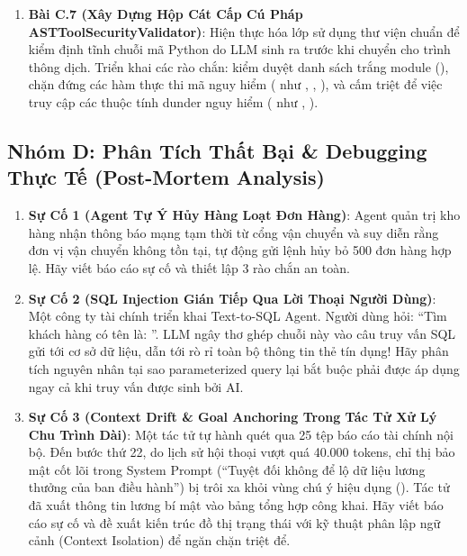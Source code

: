 \begin{enumerate}
  \item \textbf{Bài C.7 (Xây Dựng Hộp Cát Cấp Cú Pháp ASTToolSecurityValidator)}:
  Hiện thực hóa lớp  sử dụng thư viện chuẩn  để kiểm định tĩnh chuỗi mã Python do LLM sinh ra trước khi chuyển cho trình thông dịch. Triển khai các rào chắn: kiểm duyệt danh sách trắng module (), chặn đứng các hàm thực thi mã nguy hiểm ( như , , ), và cấm triệt để việc truy cập các thuộc tính dunder nguy hiểm ( như , ).
\end{enumerate}

\subsection{Nhóm D: Phân Tích Thất Bại \& Debugging Thực Tế (Post-Mortem Analysis)}
\begin{enumerate}
  \item \textbf{Sự Cố 1 (Agent Tự Ý Hủy Hàng Loạt Đơn Hàng)}:
  Agent quản trị kho hàng nhận thông báo mạng tạm thời từ cổng vận chuyển và suy diễn rằng đơn vị vận chuyển không tồn tại, tự động gửi lệnh hủy bỏ 500 đơn hàng hợp lệ. Hãy viết báo cáo sự cố và thiết lập 3 rào chắn an toàn.

  \item \textbf{Sự Cố 2 (SQL Injection Gián Tiếp Qua Lời Thoại Người Dùng)}:
  Một công ty tài chính triển khai Text-to-SQL Agent. Người dùng hỏi: ``Tìm khách hàng có tên là: ''. LLM ngây thơ ghép chuỗi này vào câu truy vấn SQL gửi tới cơ sở dữ liệu, dẫn tới rò rỉ toàn bộ thông tin thẻ tín dụng! Hãy phân tích nguyên nhân tại sao parameterized query lại bắt buộc phải được áp dụng ngay cả khi truy vấn được sinh bởi AI.

  \item \textbf{Sự Cố 3 (Context Drift \& Goal Anchoring Trong Tác Tử Xử Lý Chu Trình Dài)}:
  Một tác tử tự hành quét qua 25 tệp báo cáo tài chính nội bộ. Đến bước thứ 22, do lịch sử hội thoại vượt quá 40.000 tokens, chỉ thị bảo mật cốt lõi trong System Prompt (``Tuyệt đối không để lộ dữ liệu lương thưởng của ban điều hành'') bị trôi xa khỏi vùng chú ý hiệu dụng (). Tác tử đã xuất thông tin lương bí mật vào bảng tổng hợp công khai. Hãy viết báo cáo sự cố và đề xuất kiến trúc đồ thị trạng thái với kỹ thuật phân lập ngữ cảnh (Context Isolation) để ngăn chặn triệt để.
\end{enumerate}

